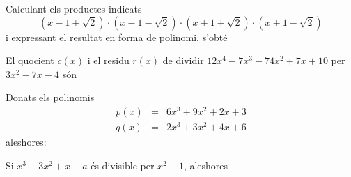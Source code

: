\begin{enumerate}
\begin{enumerate}[label=\alph*)]
\end{enumerate}

\feedback

\pregunta Calculant els productes indicats 
\begin{equation*}
(x-1+\sqrt{2})\cdot (x-1-\sqrt{2})\cdot (x+1+\sqrt{2})\cdot (x+1-\sqrt{2}) 
\end{equation*}i expressant el resultat en forma de polinomi, s’obté

\begin{enumerate}[label=\alph*)]





\end{enumerate}

\feedback

\pregunta El quocient $c(x)$ i el residu $r(x)$ de dividir $12x^{4}-7x^{3}-74x^{2}+7x+10$ per $3x^{2}-7x-4$ són

\begin{enumerate}[label=\alph*)]





\end{enumerate}

\feedback

\pregunta Donats els polinomis\begin{eqnarray*}
p(x) &=&6x^{3}+9x^{2}+2x+3 \\
q(x) &=&2x^{3}+3x^{2}+4x+6
\end{eqnarray*}aleshores:

\begin{enumerate}[label=\alph*)]





\end{enumerate}

\feedback

\pregunta Si $x^{3}-3x^{2}+x-a$ és divisible per $x^{2}+1$, aleshores

\begin{enumerate}[label=\alph*)]





\end{enumerate}

\feedback

\end{enumerate}

\bigskip
